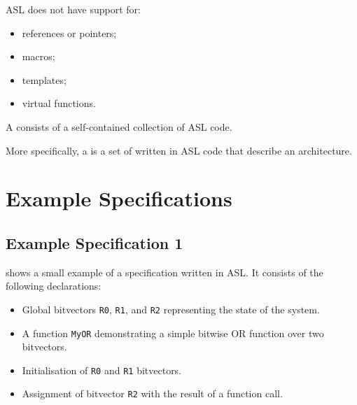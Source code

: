 ASL does not have support for:
\begin{itemize}
    \item references or pointers;
    \item macros;
    \item templates;
    \item virtual functions.
\end{itemize}

A \emph{\specificationterm} consists of a self-contained collection of ASL code.

More specifically, a \specificationterm{} is a set of \globaldeclarationsterm{}
written in ASL code that describe an architecture.

\section{Example Specifications}

\subsection{Example Specification 1}
 shows a small example of a specification written in ASL. It consists of the following declarations:
\begin{itemize}
    \item Global bitvectors \texttt{R0}, \texttt{R1}, and \texttt{R2} representing the state of the system.
    \item A function \texttt{MyOR} demonstrating a simple bitwise OR function over two bitvectors.
    \item Initialisation of \texttt{R0} and \texttt{R1} bitvectors.
    \item Assignment of bitvector \texttt{R2} with the result of a function call.
\end{itemize}

\begin{center}

\end{center}


